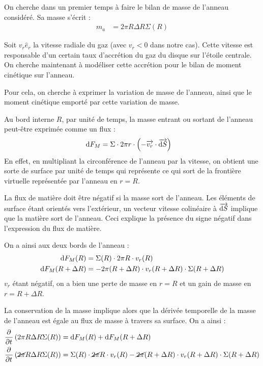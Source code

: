 On cherche dans un premier temps à faire le bilan de masse de l'anneau considéré. Sa masse s'écrit :
\begin{align}
m_a &= 2\pi R \Delta R \Sigma(R)\label{eq:m_a}
\end{align}

\bigskip

Soit $v_r\hat{e}_r$ la vitesse radiale du gaz (avec $v_r<0$ dans notre cas). Cette vitesse est responsable d'un certain taux d'accrétion du gaz du disque sur l'étoile centrale. On cherche maintenant à modéliser cette accrétion pour le bilan de moment cinétique sur l'anneau.

Pour cela, on cherche à exprimer la variation de masse de l'anneau, ainsi que le moment cinétique emporté par cette variation de masse. 

Au bord interne $R$, par unité de temps, la masse entrant ou sortant de l'anneau peut-être exprimée comme un flux :
\begin{align}
\operatorname{d \!} F_M &= \Sigma \cdot 2\pi r \cdot \left( -{\overrightarrow{v_r}} \cdot {\overrightarrow{\operatorname{d \!}S}} \right)
\end{align}
En effet, en multipliant la circonférence de l'anneau par la vitesse, on obtient une sorte de surface par unité de temps qui représente ce qui sort de la frontière virtuelle représentée par l'anneau en $r=R$. 

La flux de matière doit être négatif si la masse sort de l'anneau. Les éléments de surface étant orientés vers l'extérieur, un vecteur vitesse colinéaire à ${\overrightarrow{\operatorname{d \!} S}}$ implique que la matière sort de l'anneau. Ceci explique la présence du signe négatif dans l'expression du flux de matière.

On a ainsi aux deux bords de l'anneau :
\begin{subequations}
\begin{align}
\operatorname{d \!} F_M(R) &= \Sigma(R) \cdot 2\pi R \cdot v_r(R)\\
\operatorname{d \!} F_M(R+\Delta R) &= - 2\pi (R+\Delta R) \cdot v_r(R+\Delta R) \cdot \Sigma(R+\Delta R)
\end{align}\label{eq:dif_F_M}
\end{subequations}
$v_r$ étant négatif, on a bien une perte de masse en $r=R$ et un gain de masse en $r=R+\Delta R$.

La conservation de la masse implique alors que la dérivée temporelle de la masse de l'anneau est égale au flux de masse à travers sa surface. On a ainsi : 
\begin{align*}
\mathinner{ \dfrac{\partial{^{}}}{\partial{{t}^{}}} }\left(2\pi R \Delta R \Sigma(R)\right) &= \operatorname{d \!} F_M(R) + \operatorname{d \!} F_M(R+\Delta R)\\
\mathinner{ \dfrac{\partial{^{}}}{\partial{{t}^{}}} }\left(\cancel{2\pi}R \Delta R \Sigma(R)\right) &= \Sigma(R) \cdot \cancel{2\pi} R \cdot v_r(R) - \cancel{2\pi} (R+\Delta R) \cdot v_r(R+\Delta R) \cdot \Sigma(R+\Delta R)
\end{align*}


